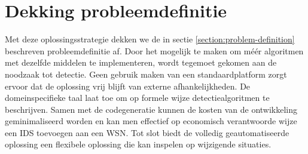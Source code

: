 \vspace{-3mm}

\section{Dekking probleemdefinitie}
\label{section:problem-coverage}

Met deze oplossingsstrategie dekken we de in sectie
\ref{section:problem-definition} beschreven probleemdefinitie af. Door het
mogelijk te maken om m\'e\'er algoritmen met dezelfde middelen te
implementeren, wordt tegemoet gekomen aan de noodzaak tot detectie. Geen
gebruik maken van een standaardplatform zorgt ervoor dat de oplossing vrij
blijft van externe afhankelijkheden. De domeinspecifieke taal laat toe om op
formele wijze detectiealgoritmen te beschrijven. Samen met de codegeneratie
kunnen de kosten van de ontwikkeling geminimaliseerd worden en kan men
effectief op economisch verantwoorde wijze een IDS toevoegen aan een WSN. Tot
slot biedt de volledig geautomatiseerde oplossing een flexibele oplossing die
kan inspelen op wijzigende situaties.
